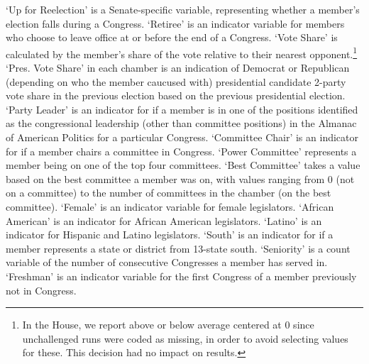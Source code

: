 \documentclass[12pt]{article}
\begin{document}
`Up for Reelection' is a Senate-specific variable, representing whether a member's election falls during a Congress. `Retiree' is an indicator variable for members who choose to leave office at or before the end of a Congress. `Vote Share' is calculated by the member's share of the vote relative to their nearest opponent.\footnote{\doublespacing\normalsize In the House, we report above or below average centered at 0 since unchallenged runs were coded as missing, in order to avoid selecting values for these. This decision had no impact on results.}  `Pres. Vote Share' in each chamber is an indication of Democrat or Republican (depending on who the member caucused with) presidential candidate 2-party vote share in the previous election based on the previous presidential election.  `Party Leader' is an indicator for if a member is in one of the positions identified as the congressional leadership (other than committee positions) in the Almanac of American Politics for a particular Congress. `Committee Chair' is an indicator for if a member chairs a committee in Congress. `Power Committee' represents a member being on one of the top four committees.  `Best Committee' takes a value based on the best committee a member was on, with values ranging from 0 (not on a committee) to the number of committees in the chamber (on the best committee). `Female' is an indicator variable for female legislators. `African American' is an indicator for African American legislators. `Latino' is an indicator for Hispanic and Latino legislators. `South' is an indicator for if a member represents a state or district from 13-state south. `Seniority' is a count variable of the number of consecutive Congresses a member has served in. `Freshman' is an indicator variable for the first Congress of a member previously not in Congress.
\end{document}
